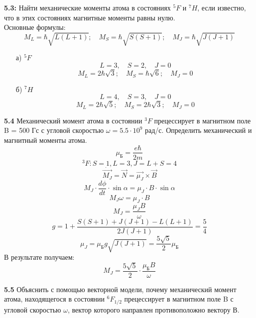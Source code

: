 	\textbf{5.3: }
		Найти механические моменты атома в состояниях \( ^5F \) и \( ^7H \), 
		если известно, что в этих состояниях магнитные моменты равны нулю.\\
		Основные формулы:
		\[
			M_L = \hbar\sqrt{L(L+1)};\quad
			M_S = \hbar\sqrt{S(S+1)};\quad
			M_J = \hbar\sqrt{J(J+1)}
		\]
		\begin{itemize}\itemsep-8pt
			\item[а)] \( ^5F \)
				\[ L = 3,\quad S = 2,\quad J = 0 \] 
				\[ 
					M_L = 2\hbar\sqrt{3};\quad
					M_S = \hbar\sqrt{6};\quad
					M_J = 0
				\]
			\item[б)] \( ^7H \)
				\[ L = 4,\quad S = 3,\quad J = 0 \] 
				\[ 
					M_L = 2\hbar\sqrt{5};\quad
					M_S = 2\hbar\sqrt{3};\quad
					M_J = 0
				\]
		\end{itemize}

	\textbf{5.4 }
		Механический момент атома в состоянии \( ^3F \) прецессирует 
		в магнитном поле B = 500 Гс с угловой скоростью 
		\( \omega = 5.5\cdot10^9 \) рад/с. Определить механический 
		и магнитный моменты атома.
		\[ \mu_\text{Б} = \frac{e\hbar}{2m} \]
		\[ ^3F: S = 1, L = 3, J = L+S = 4 \]
		\[ \dot{\vec{M_J}} = \vec{N} = \vec{\mu_J}\times\vec{B} \]
		\[ M_J\cdot\frac{d\phi}{dt}\cdot\sin\alpha = \mu_J\cdot B\cdot\sin\alpha \]
		\[ M_J\omega = \mu_J\cdot B \]
		\[ M_J = \frac{\mu_JB}{\omega} \]
		\[ g = 1 + \frac{S(S+1)+J(J+1)-L(L+1)}{2J(J+1)} = \frac{5}{4} \]
		\[ \mu_J = \mu_\text{Б}g\sqrt{J(J+1)} = \frac{5\sqrt{5}}{2}\mu_\text{Б} \]
		В результате получаем:
		\[ M_J = \frac{5\sqrt{5}}{2}\cdot\frac{\mu_\text{Б}B}{\omega} \]

	\textbf{5.5 }
		Объяснить с помощью векторной модели, почему механический момент
		атома, находящегося в состоянии \(^6F_{1/2} \) прецессирует в 
		магнитном поле B с угловой скоростью \( \omega \), вектор 
		которого направлен противоположно вектору В.

